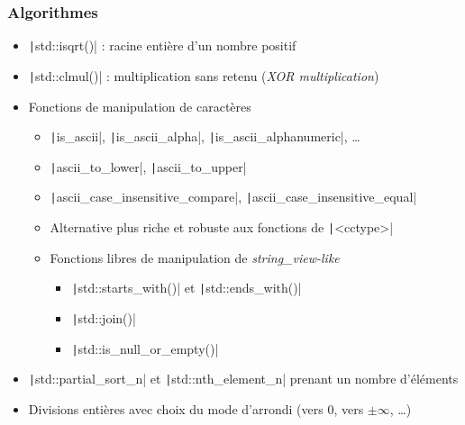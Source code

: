 \documentclass[C++.tex]{subfiles}
\begin{document}
\begin{frame}[fragile]
	\frametitle{Algorithmes}
	\begin{itemize}
		\item \texttt|std::isqrt()| : racine entière d'un nombre positif


		\item \texttt|std::clmul()| : multiplication sans retenu (\textit{XOR multiplication})
		\item Fonctions de manipulation de caractères
		\begin{itemize}
			\item \texttt|is_ascii|, \texttt|is_ascii_alpha|, \texttt|is_ascii_alphanumeric|, \ldots
			\item \texttt|ascii_to_lower|, \texttt|ascii_to_upper|
			\item \texttt|ascii_case_insensitive_compare|, \texttt|ascii_case_insensitive_equal|
			\item Alternative plus riche et robuste aux fonctions de \texttt|<cctype>|


			\item Fonctions libres de manipulation de \textit{string\_view-like}
			\begin{itemize}
				\item \texttt|std::starts_with()| et \texttt|std::ends_with()|
				\item \texttt|std::join()|
				\item \texttt|std::is_null_or_empty()|
			\end{itemize}
		\end{itemize}
		\item \texttt|std::partial_sort_n| et \texttt|std::nth_element_n| prenant un nombre d'éléments
		\item Divisions entières avec choix du mode d'arrondi (vers $0$, vers $\pm \infty$, \ldots)
	\end{itemize}

\end{frame}
\end{document}
